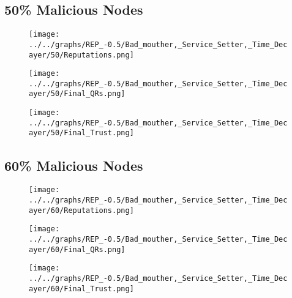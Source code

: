 \begin{minipage}[t]{0.49\columnwidth}
\subsection*{50\% Malicious Nodes}
    \begin{figure}[H]
        \centering
        \texttt{[image: ../../graphs/REP\_-0.5/Bad\_mouther,\_Service\_Setter,\_Time\_Decayer/50/Reputations.png]}
    \end{figure}
    \begin{figure}[H]
        \centering
        \texttt{[image: ../../graphs/REP\_-0.5/Bad\_mouther,\_Service\_Setter,\_Time\_Decayer/50/Final\_QRs.png]}
    \end{figure}
\end{minipage}
\begin{minipage}[t]{0.49\columnwidth}
    \begin{figure}[H]
        \centering
        \texttt{[image: ../../graphs/REP\_-0.5/Bad\_mouther,\_Service\_Setter,\_Time\_Decayer/50/Final\_Trust.png]}
    \end{figure}
\end{minipage}

\begin{minipage}[t]{0.49\columnwidth}
\subsection*{60\% Malicious Nodes}
    \begin{figure}[H]
        \centering
        \texttt{[image: ../../graphs/REP\_-0.5/Bad\_mouther,\_Service\_Setter,\_Time\_Decayer/60/Reputations.png]}
    \end{figure}
    \begin{figure}[H]
        \centering
        \texttt{[image: ../../graphs/REP\_-0.5/Bad\_mouther,\_Service\_Setter,\_Time\_Decayer/60/Final\_QRs.png]}
    \end{figure}
\end{minipage}
\begin{minipage}[t]{0.49\columnwidth}
    \begin{figure}[H]
        \centering
        \texttt{[image: ../../graphs/REP\_-0.5/Bad\_mouther,\_Service\_Setter,\_Time\_Decayer/60/Final\_Trust.png]}
    \end{figure}
\end{minipage}
\newpage

